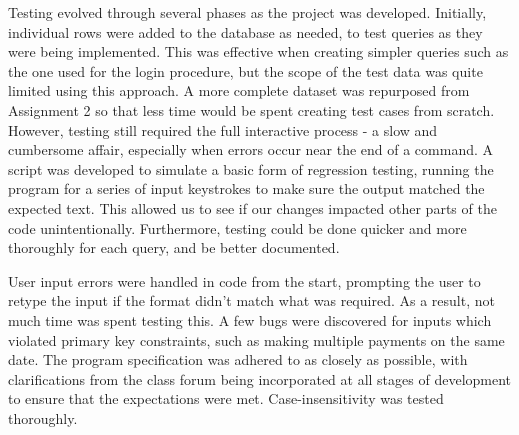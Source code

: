 Testing evolved through several phases as the project was developed.  Initially, individual rows were added to the database as needed, to test queries as they were being implemented.  This was effective when creating simpler queries such as the one used for the login procedure, but the scope of the test data was quite limited using this approach.  A more complete dataset was repurposed from Assignment 2 so that less time would be spent creating test cases from scratch.  However, testing still required the full interactive process - a slow and cumbersome affair, especially when errors occur near the end of a command. A script was developed to simulate a basic form of regression testing, running the program for a series of input keystrokes to make sure the output matched the expected text.  This allowed us to see if our changes impacted other parts of the code unintentionally.  Furthermore, testing could be done quicker and more thoroughly for each query, and be better documented.

User input errors were handled in code from the start, prompting the user to retype the input if the format didn't match what was required.  As a result, not much time was spent testing this.  A few bugs were discovered for inputs which violated primary key constraints, such as making multiple payments on the same date.  The program specification was adhered to as closely as possible, with clarifications from the class forum being incorporated at all stages of development to ensure that the expectations were met.  Case-insensitivity was tested thoroughly.
